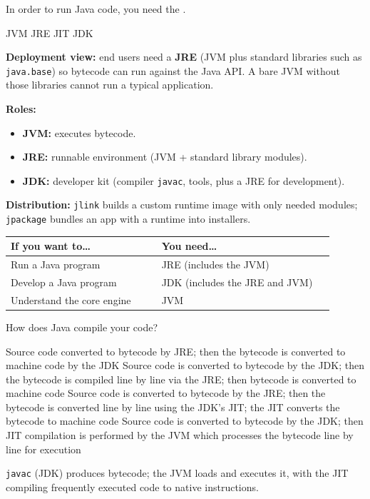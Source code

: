 \question[4]
In order to run Java code, you need the \blank[3em].
\begin{choices}
  \choice JVM
  \CorrectChoice JRE
  \choice JIT
  \choice JDK
\end{choices}
\begin{solution}
  \textbf{Deployment view:} end users need a \textbf{JRE} (JVM plus standard libraries such as \texttt{java.base}) so bytecode can run against the Java API. A bare JVM without those libraries cannot run a typical application.

  \textbf{Roles:}
  \begin{itemize}
    \item \textbf{JVM:} executes bytecode.
    \item \textbf{JRE:} runnable environment (JVM + standard library modules).
    \item \textbf{JDK:} developer kit (compiler \texttt{javac}, tools, plus a JRE for development).
  \end{itemize}

  \textbf{Distribution:} \texttt{jlink} builds a custom runtime image with only needed modules; \texttt{jpackage} bundles an app with a runtime into installers.

  \begin{center}
  \small
  \begin{tabular}{@{}p{0.42\linewidth}p{0.48\linewidth}@{}}
  \hline
  \textbf{If you want to\ldots} & \textbf{You need\ldots} \\
  \hline
  Run a Java program & JRE (includes the JVM) \\
  Develop a Java program & JDK (includes the JRE and JVM) \\
  Understand the core engine & JVM \\
  \hline
  \end{tabular}
  \end{center}
\end{solution}

\newpage

\question[4]
How does Java compile your code?
\begin{choices}
  \choice Source code converted to bytecode by JRE; then the bytecode is converted to machine code by the JDK
  \choice Source code is converted to bytecode by the JDK; then the bytecode is compiled line by line via the JRE; then bytecode is converted to machine code
  \choice Source code is converted to bytecode by the JRE; then the bytecode is converted line by line using the JDK's JIT; the JIT converts the bytecode to machine code
  \CorrectChoice Source code is converted to bytecode by the JDK; then JIT compilation is performed by the JVM which processes the bytecode line by line for execution
\end{choices}
\begin{solution}
  \texttt{javac} (JDK) produces bytecode; the JVM loads and executes it, with the JIT compiling frequently executed code to native instructions.
\end{solution}

